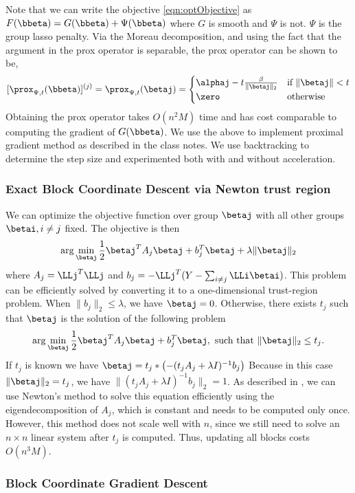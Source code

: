 Note that we can write the objective \eqref{eqn:optObjective} as $F(\bbeta) =
G(\bbeta) + \Psi(\bbeta)$ where $G$ is smooth and $\Psi$ is not. $\Psi$ is the
group lasso penalty. Via the Moreau decomposition, and using the fact
that the argument in the prox operator is separable, the prox operator can
be shown to be,
\[
[\prox_{\Psi, t} (\bbeta)]^{(j)} =
\prox_{\Psi, t} (\betaj) = 
  \begin{cases}
    \alphaj - t \frac{\beta}{\|\betaj\|_2} & \text{if } 
              \|\betaj\| < t \\
    \zero & \text{otherwise}
  \end{cases}
\]
Obtaining the prox operator takes $O(n^2M)$ time and has cost comparable to
computing the gradient of $G(\bbeta)$. We use the above to implement proximal
gradient method as described in the class notes. We use backtracking to
determine the step size and experimented both with and without acceleration.

\subsubsection*{Exact Block Coordinate Descent via Newton trust region}

We can optimize the objective function over group $\betaj$ with all other groups
$\betai, i \ne j$ fixed. The objective is then
\[
\arg\min_\betaj \frac{1}{2}\betaj^T A_j \betaj + b_j^T \betaj + \lambda \|\betaj\|_2
\]
where $A_j = \LLj^T \LLj$ 
and $b_j = -\LLj^T (Y-\sum_{i\ne j}{\LLi \betai})$.
This problem can be efficiently solved \citep{bcd-group-lasso:2013} 
by converting it to a one-dimensional trust-region problem. 
When $\|b_j\|_2 \le \lambda$, we have $\betaj = 0$. 
Otherwise, there exists $t_j$ such that $\betaj$ is the solution of
the following problem
\[
\arg\min_\betaj \frac{1}{2}\betaj^T A_j \betaj + b_j^T \betaj, 
\text{ such that } \|\betaj\|_2 \le t_j.
\]
If $t_j$ is known we have $\betaj = t_j * \left(-(t_j A_j + \lambda I)^{-1} b_j\right)$
Because in this case $\|\betaj\|_2 = t_j$, we have $\|(t_j A_j + \lambda I)^{-1} b_j\|_2 = 1$.
As described in \citet{bcd-group-lasso:2013}, 
we can use Newton's method to solve this equation efficiently 
using the eigendecomposition of $A_j$, which is constant and needs to be computed only once.
However, this method does not scale well with $n$, since we still need
to solve an $n \times n$ linear system after $t_j$ is computed.
Thus, updating all blocks costs $O(n^3 M)$.

\subsubsection*{Block Coordinate Gradient Descent}

